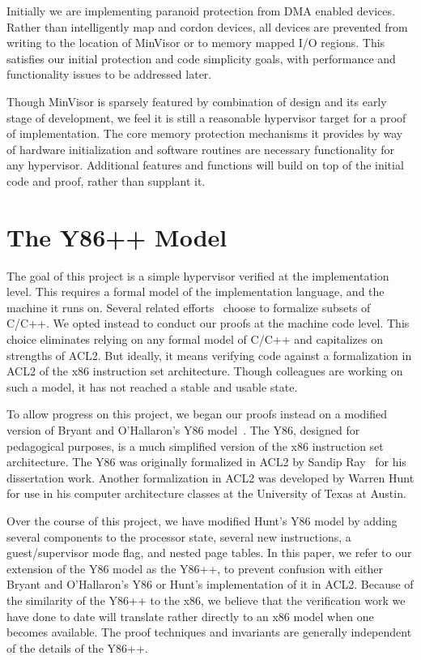 \documentclass[submission,copyright]{eptcs} \providecommand{\event}{ACL2 2011}
\begin{document}
Initially we are implementing paranoid protection from DMA enabled
devices. Rather than intelligently map and cordon devices, all devices
are prevented from writing to the location of MinVisor or to memory
mapped I/O regions. This satisfies our initial protection and code simplicity
goals, with performance and functionality issues to be addressed
later.

Though MinVisor is sparsely featured by combination of design and
its early stage of development, we feel it is still a reasonable hypervisor
target for a proof of implementation. The core memory protection mechanisms
it provides by way of hardware initialization and software routines
are necessary functionality for any hypervisor. Additional features and
functions will build on top of the initial code and proof, rather
than supplant it.

\section{The Y86++ Model}
\label{The Y86++ Model}
\label{Y86++}

The goal of this project is a simple hypervisor verified at the
implementation level.  This requires a formal model of the
implementation language, and the machine it runs on.  Several related
efforts~\cite{seL4, Nova} choose to formalize subsets of C/C++.  We
opted instead to conduct our proofs at the machine code level.  This
choice eliminates relying on any formal model of C/C++ and capitalizes
on strengths of ACL2.  But ideally, it means verifying code against a
formalization in ACL2 of the x86 instruction set architecture.  Though
colleagues are working on such a model, it has not reached a stable
and usable state.

To allow progress on this project, we began our proofs instead on a
modified version of Bryant and O'Hallaron's Y86
model~\cite{BryantOHallaron}.  The Y86, designed for pedagogical
purposes, is a much simplified version of the x86 instruction set
architecture.  The Y86 was originally formalized in ACL2 by Sandip
Ray~\cite{Raydissertation} for his dissertation work.  Another
formalization in ACL2 was developed by Warren Hunt for use in his
computer architecture classes at the University of Texas at Austin.

Over the course of this project, we have modified Hunt's Y86 model by
adding several components to the processor state, several new
instructions, a guest/supervisor mode flag, and nested page tables.
In this paper, we refer to our extension of the Y86 model as the
Y86++, to prevent confusion with either Bryant and O'Hallaron's Y86 or
Hunt's implementation of it in ACL2.  Because of the similarity of the
Y86++ to the x86, we believe that the verification work we have done
to date will translate rather directly to an x86 model when one
becomes available.  The proof techniques and invariants are generally
independent of the details of the Y86++.
\end{document}
